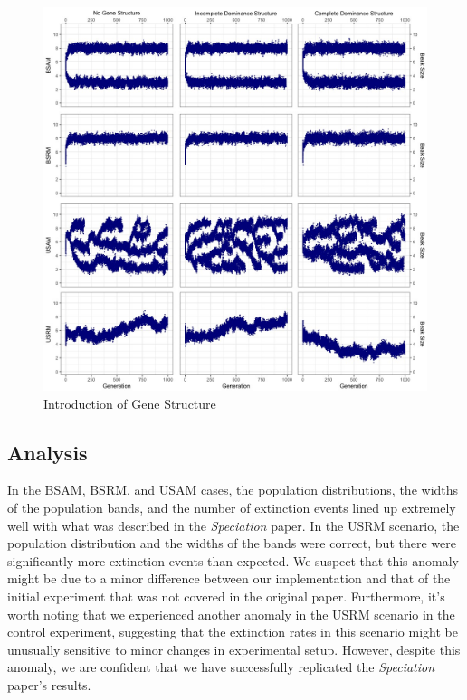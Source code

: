 \documentclass[conference]{IEEEtran}
\begin{document}
\begin{figure}
    \centering
    \includegraphics[width=\linewidth]{Data/EXP2}
    \caption{Introduction of Gene Structure}
    \label{fig:EXP2}
\end{figure}

\subsection{Analysis}

In the BSAM, BSRM, and USAM cases, the population distributions, the widths of the population bands, and the number of extinction events lined up extremely well with what was described in the \textit{Speciation} paper. In the USRM scenario, the population distribution and the widths of the bands were correct, but there were significantly more extinction events than expected. We suspect that this anomaly might be due to a minor difference between our implementation and that of the initial experiment that was not covered in the original paper. Furthermore, it’s worth noting that we experienced another anomaly in the USRM scenario in the control experiment, suggesting that the extinction rates in this scenario might be unusually sensitive to minor changes in experimental setup. However, despite this anomaly, we are confident that we have successfully replicated the \textit{Speciation} paper’s results.
\end{document}
